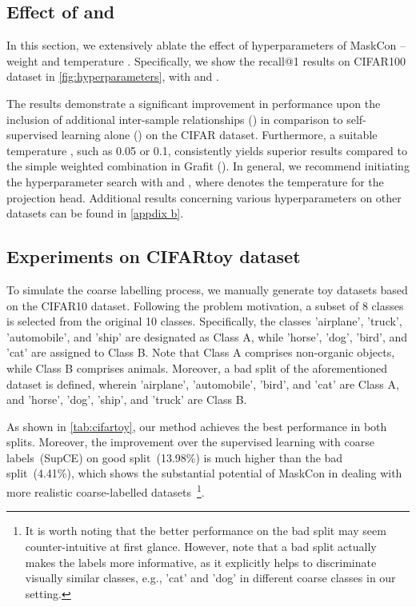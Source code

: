 \documentclass[10pt,twocolumn,letterpaper]{article}
\begin{document}
\subsection{Effect of  and }\label{exp:ablations}
In this section, we extensively ablate the effect of hyperparameters of MaskCon -- weight  and temperature . Specifically, we show the recall@1 results on CIFAR100 dataset in \cref{fig:hyperparameters}, with  and . 





The results demonstrate a significant improvement in performance upon the inclusion of additional inter-sample relationships () in comparison to self-supervised learning alone () on the CIFAR dataset. Furthermore, a suitable temperature , such as 0.05 or 0.1, consistently yields superior results compared to the simple weighted combination in Grafit (). In general, we recommend initiating the hyperparameter search with  and , where  denotes the temperature for the projection head. Additional results concerning various hyperparameters on other datasets can be found in \cref{appdix b}.



\subsection{Experiments on CIFARtoy dataset} \label{exp:cifartoy}
To simulate the coarse labelling process, we manually generate toy datasets based on the CIFAR10 dataset. Following the problem motivation, a subset of 8 classes is selected from the original 10 classes. Specifically, the classes 'airplane', 'truck', 'automobile', and 'ship' are designated as Class A, while 'horse', 'dog', 'bird', and 'cat' are assigned to Class B. Note that Class A comprises non-organic objects, while Class B comprises animals. Moreover, a bad split of the aforementioned dataset is defined, wherein 'airplane', 'automobile', 'bird', and 'cat' are Class A, and 'horse', 'dog', 'ship', and 'truck' are Class B.


As shown in \cref{tab:cifartoy}, our method achieves the best performance in both splits. Moreover, the improvement over the supervised learning with coarse labels~(SupCE) on good split~(13.98\%) is much higher than the bad split~(4.41\%), which shows the substantial potential of MaskCon in dealing with more realistic coarse-labelled datasets~\footnote{
It is worth noting that the better performance on the bad split may seem counter-intuitive at first glance.
However, note that a bad split actually makes the labels more informative, as it explicitly helps to discriminate visually similar classes, e.g., 'cat' and 'dog' in different coarse classes in our setting.}.
\end{document}
